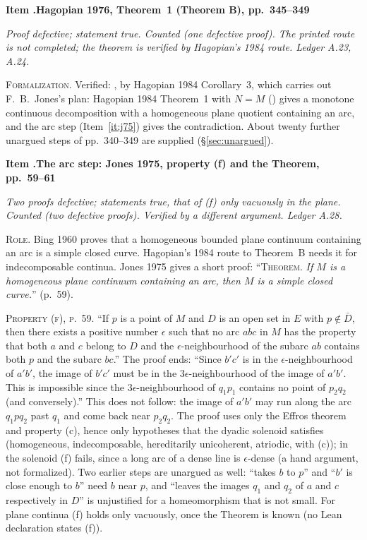 \documentclass[11pt]{article}
\newcounter{defect}
\newenvironment{defect}[4]{%
  \par\addvspace{10pt}\refstepcounter{defect}%
  \noindent\textbf{Item \thedefect.\enspace #1}\par\nopagebreak
  \noindent\textit{#2}\par\nopagebreak\smallskip}{\par\addvspace{6pt}}
\newcommand{\fld}[1]{\par\noindent\textsc{#1.}\enspace}
\begin{document}
\begin{defect}{Hagopian 1976, Theorem~1 (Theorem B), pp.~345--349}{Proof defective; statement true.
Counted (one defective proof). The printed route is not completed; the theorem is verified by
Hagopian's 1984 route. Ledger A.23, A.24.}{0}{1}
\fld{Formalization} Verified: , by Hagopian 1984 Corollary~3, which
carries out F.~B.~Jones's plan: Hagopian 1984 Theorem~1 with $N=M$ ()
gives a monotone continuous decomposition with a homogeneous plane quotient containing an arc, and
the arc step (Item~\ref{it:j75}) gives the contradiction. About twenty further unargued steps of
pp.~340--349 are supplied (\S\ref{sec:unargued}).
\end{defect}

\begin{defect}{The arc step: Jones 1975, property (f) and the Theorem, pp.~59--61}{Two proofs
defective; statements true, that of (f) only vacuously in the plane. Counted (two defective
proofs). Verified by a different argument.
Ledger A.28.}{0}{2}\label{it:j75}

\fld{Role} Bing 1960 \cite{B60} proves that a homogeneous bounded plane continuum containing an arc
is a simple closed curve. Hagopian's 1984 route to Theorem~B needs it for indecomposable continua.
Jones 1975 \cite{J75} gives a short proof: ``\textsc{Theorem}. \emph{If $M$ is a homogeneous plane
continuum containing an arc, then $M$ is a simple closed curve.}'' (p.~59).

\fld{Property (f), p.~59} ``If $p$ is a point of $M$ and $D$ is an open set in $E$ with
$p\notin\bar D$, then there exists a positive number $\epsilon$ such that no arc $abc$ in $M$ has
the property that both $a$ and $c$ belong to $D$ and the $\epsilon$-neighbourhood of the subarc
$ab$ contains both $p$ and the subarc $bc$.'' The proof ends: ``Since $b'c'$ is in the
$\epsilon$-neighbourhood of $a'b'$, the image of $b'c'$ must be in the $3\epsilon$-neighbourhood of
the image of $a'b'$. This is impossible since the $3\epsilon$-neighbourhood of $q_1p_1$ contains no
point of $p_2q_2$ (and conversely).'' This does not follow: the image of $a'b'$ may run along the
arc $q_1pq_2$ past $q_1$ and come back near $p_2q_2$. The proof uses only the Effros theorem and
property (c), hence only hypotheses that the dyadic solenoid satisfies (homogeneous,
indecomposable, hereditarily unicoherent, atriodic, with (c)); in the solenoid (f) fails, since a
long arc of a dense line is $\epsilon$-dense (a hand argument, not formalized). Two earlier steps
are unargued as well: ``takes $b$ to $p$'' and ``$b'$ is close enough to $b$'' need $b$ near $p$,
and ``leaves the images $q_1$ and $q_2$ of $a$ and $c$ respectively in $D$'' is unjustified for a
homeomorphism that is not small. For plane continua (f) holds only vacuously, once the Theorem
is known (no Lean declaration states (f)).


\end{defect}
\end{document}
